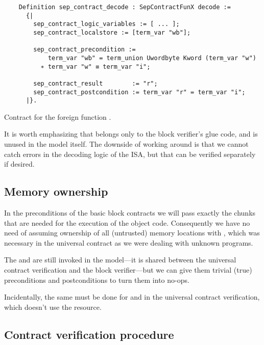 \begin{listing}[htb]
  \begin{verbatim}
    Definition sep_contract_decode : SepContractFunX decode :=
      {|
        sep_contract_logic_variables := [ ... ];
        sep_contract_localstore := [term_var "wb"];

        sep_contract_precondition :=
            term_var "wb" = term_union Uwordbyte Kword (term_var "w")
          ∗ term_var "w" ≡ term_var "i";

        sep_contract_result        := "r";
        sep_contract_postcondition := term_var "r" = term_var "i";
      |}.
  \end{verbatim}
  \caption{Contract for the foreign function .}
  \label{lst:decode}
\end{listing}

It is worth emphasizing that  belongs only to the block verifier's glue code, and is unused in the model itself. The downside of working around  is that we cannot catch errors in the decoding logic of the ISA, but that can be verified separately if desired.

\subsection{Memory ownership}

In the preconditions of the basic block contracts we will pass exactly the  chunks that are needed for the execution of the object code. Consequently we have no need of assuming ownership of all (untrusted) memory locations with , which was necessary in the universal contract as we were dealing with unknown programs.

The  and  are still invoked in the \usail model---it is shared between the universal contract verification and the block verifier---but we can give them trivial (true) preconditions and postconditions to turn them into no-ops.

Incidentally, the same must be done for  and  in the universal contract verification, which doesn't use the  resource.

\subsection{Contract verification procedure}

